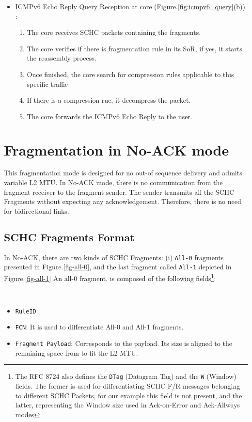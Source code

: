 \begin{itemize}
\item ICMPv6 Echo Reply Query Reception at core (Figure.\ref{fig:icmpv6_query}(b)) : 
\begin{enumerate}
    \item The core receives SCHC packets containing the fragments.
    \item The core verifies if there is fragmentation rule in its SoR, if yes, it starts the reassembly process.
    \item Once finished, the core search for compression rules applicable to this specific traffic 
    \item If there is a compression rue, it decompress the packet.
    \item The core forwards the ICMPv6 Echo Reply to the user.
\end{enumerate}
\end{itemize}

\section{Fragmentation in No-ACK mode}

This fragmentation mode is designed for no out-of sequence delivery and admits variable L2 MTU.
In No-ACK mode, there is no communication from the fragment receiver to the fragment sender.  
The sender transmits all the SCHC Fragments without expecting any acknowledgement.  
Therefore, there is no need for bidirectional links.

\subsection{SCHC Fragments Format}

In No-ACK, there are two kinds of SCHC Fragments: (i) \texttt{All-0} fragments presented in Figure.\ref{fig-all-0}, and the last fragment called \texttt{All-1} depicted in Figure.\ref{fig-all-1}
An all-0 fragment, is composed of the following fields\footnote{The RFC 8724 also defines the \texttt{DTag} (Datagram Tag) and the \texttt{W} (Window) fields. The former is used for differentiating SCHC F/R messages belonging to different SCHC Packets, for our example this field is not present, and the latter, representing the Window size used in Ack-on-Error and Ack-Allways modes}:

~

\begin{itemize}
    \item \texttt{RuleID}
    \item \texttt{FCN}: It is used to differentiate All-0 and All-1 fragments. 
    \item \texttt{Fragment Payload}: Corresponds to the payload. Its size is aligned to the remaining space from to fit the L2 MTU.
\end{itemize}

